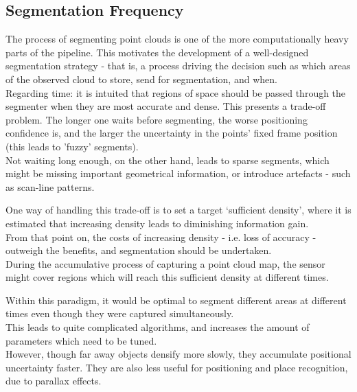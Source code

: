 \subsection{Segmentation Frequency}
\label{subsec:segmentation-frequency}

The process of segmenting point clouds is one of the more computationally heavy parts of the pipeline. This motivates the development of a well-designed segmentation strategy - that is, a process driving the decision such as which areas of the observed cloud to store, send for segmentation, and when.\\

Regarding time: it is intuited that regions of space should be passed through the segmenter when they are most accurate and dense. This presents a trade-off problem. The longer one waits before segmenting, the worse positioning confidence is, and the larger the uncertainty in the points' fixed frame position (this leads to 'fuzzy' segments).\\

Not waiting long enough, on the other hand, leads to sparse segments, which might be missing important geometrical information, or introduce artefacts - such as scan-line patterns.

One way of handling this trade-off is to set a target `sufficient density', where it is estimated that increasing density leads to diminishing information gain.\\

From that point on, the costs of increasing density - i.e. loss of accuracy - outweigh the benefits, and segmentation should be undertaken.\\

During the accumulative process of capturing a point cloud map, the sensor might cover regions which will reach this sufficient density at different times.

Within this paradigm, it would be optimal to segment different areas at different times even though they were captured simultaneously.\\


This leads to quite complicated algorithms, and increases the amount of parameters which need to be tuned.\\

However, though far away objects densify more slowly, they accumulate positional uncertainty faster. They are also less useful for positioning and place recognition, due to parallax effects.\\

